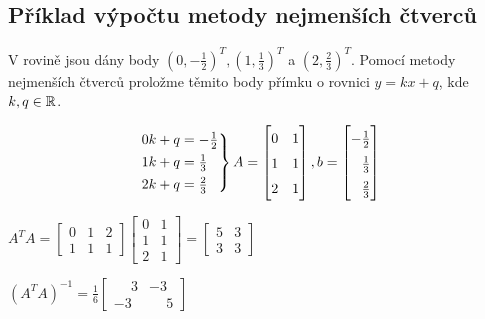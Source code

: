 \subsection{Příklad výpočtu metody nejmenších čtverců}
V rovině jsou dány body $(0, -\frac{1}{2})^T, (1, \frac{1}{3})^T$ a $(2, \frac{2}{3})^T$. Pomocí metody nejmenších 
čtverců proložme těmito body přímku o rovnici $y = kx + q$, kde $k ,q \in \mathbb{R}$.

\[
\begin{rcases*}
    0k + q = -\frac{1}{2} \\
    1k + q = \frac{1}{3} \\
    2k + q = \frac{2}{3}
\end{rcases*} 
A = 
\begin{bmatrix}
    0 & 1 \\
    1 & 1 \\
    2 & 1
\end{bmatrix},
b = 
\begingroup
    \renewcommand*{\arraystretch}{1.5}
    \begin{bmatrix}
        -\frac{1}{2} \\
        \phantom{-}\frac{1}{3} \\
        \phantom{-}\frac{2}{3}
    \end{bmatrix}
\endgroup
\]

$A^T A = 
\begin{bmatrix}
    0 & 1 & 2 \\
    1 & 1 & 1
\end{bmatrix}
\begin{bmatrix}
    0 & 1 \\
    1 & 1 \\
    2 & 1 
\end{bmatrix} =
\begin{bmatrix}
    5 & 3 \\
    3 & 3
\end{bmatrix}$

$(A^T A)^{-1} = \frac{1}{6}
\begin{bmatrix}
    \phantom{-}3 & -3 \\
    -3 & \phantom{-}5
\end{bmatrix}$


